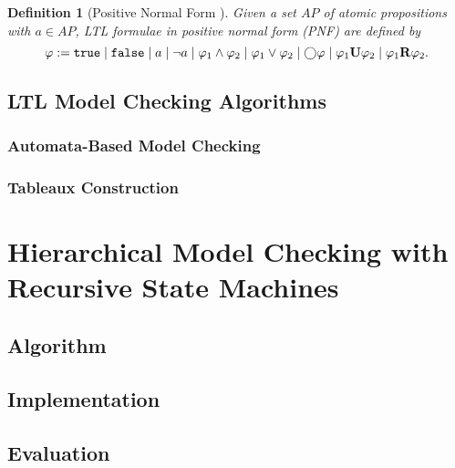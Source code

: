 \documentclass[a4paper, 12pt, twoside]{report}
\theoremstyle{plain}
\newtheorem{definition}[theorem]{Definition}
\begin{document}
	
	\begin{definition}[Positive Normal Form \cite{baier2008principles}]\label{def:ltl_pnf}
		Given a set $AP$ of atomic propositions with $a \in AP$, LTL formulae in \textup{positive normal form} (PNF) are defined by
		\begin{equation*}		
		\varphi := \texttt{\textup{true}} \mid \texttt{\textup{false}} \mid a \mid \neg a \mid \varphi_1 \wedge \varphi_2 \mid \varphi_1 \vee \varphi_2 \mid \bigcirc \varphi \mid \varphi_1 \textbf{\textup{U}} \varphi_2 \mid \varphi_1 \textbf{\textup{R}} \varphi_2.
		\end{equation*}
	\end{definition}


	
	
	\section{LTL Model Checking Algorithms}
	
	\subsection{Automata-Based Model Checking} 
		


	\subsection{Tableaux Construction}
	
	\chapter{Hierarchical Model Checking with Recursive State Machines}	
	\section{Algorithm}
	\section{Implementation}
	\section{Evaluation}
	
\end{document}
